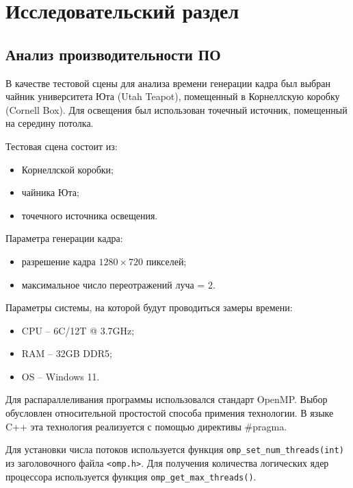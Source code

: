 \chapter{Исследовательский раздел}

\section{Анализ производительности ПО}

В качестве тестовой сцены для анализа времени генерации кадра был выбран чайник университета Юта (Utah Teapot)\cite{utah_teapot}, помещенный в Корнеллскую коробку (Cornell Box)\cite{cornell_box}. Для освещения был использован точечный источник, помещенный на середину потолка.

\noindent Тестовая сцена состоит из:
\begin{itemize}
    \item Корнеллской коробки;
    \item чайника Юта;
    \item точечного источника освещения.
\end{itemize}

\noindent Параметра генерации кадра:
\begin{itemize}
    \item разрешение кадра $1280\times720$ пикселей;
    \item максимальное число переотражений луча = 2.
\end{itemize}

\noindent Параметры системы, на которой будут проводиться замеры времени:
\begin{itemize}
    \item CPU -- 6C/12T @ 3.7GHz;
    \item RAM -- 32GB DDR5;
    \item OS -- Windows 11.
\end{itemize}

Для распараллеливания программы использовался стандарт OpenMP\cite{openmp}. Выбор обусловлен относительной простостой способа примения технологии. В языке C++ эта технология реализуется с помощью директивы \#pragma.


Для установки числа потоков используется функция \texttt{omp\_set\_num\_threads(int)} из заголовочного файла \texttt{<omp.h>}. Для получения количества логических ядер процессора используется функция \texttt{omp\_get\_max\_threads()}.

